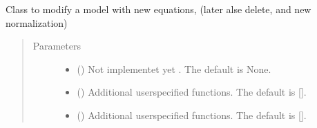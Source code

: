 \documentclass[letterpaper,10pt,english]{sphinxmanual}
\begin{document}

\begin{fulllineitems}
\label{\detokenize{index:modelclass.Modify_Mixin}}
\pysigstartsignatures
{}
\pysigstopsignatures
\sphinxAtStartPar
Class to modify a model with new equations, (later alse delete, and new normalization)

\begin{fulllineitems}
\label{\detokenize{index:modelclass.Modify_Mixin.eqflip}}
\pysigstartsignatures
{}
\pysigstopsignatures\begin{quote}\begin{description}
\item[{Parameters}] \leavevmode\begin{itemize}
\item {} 
\sphinxAtStartPar
{} (\sphinxstyleliteralemphasis{\sphinxupquote{, }}) \textendash{} Not implementet yet . The default is None.

\item {} 
\sphinxAtStartPar
{} (\sphinxstyleliteralemphasis{\sphinxupquote{, }}) \textendash{} Additional userspecified functions. The default is {[}{]}.

\item {} 
\sphinxAtStartPar
{} (\sphinxstyleliteralemphasis{\sphinxupquote{, }}) \textendash{} Additional userspecified functions. The default is {[}{]}.


\end{itemize}
\end{description}
\end{quote}
\end{fulllineitems}
\end{fulllineitems}
\end{document}
